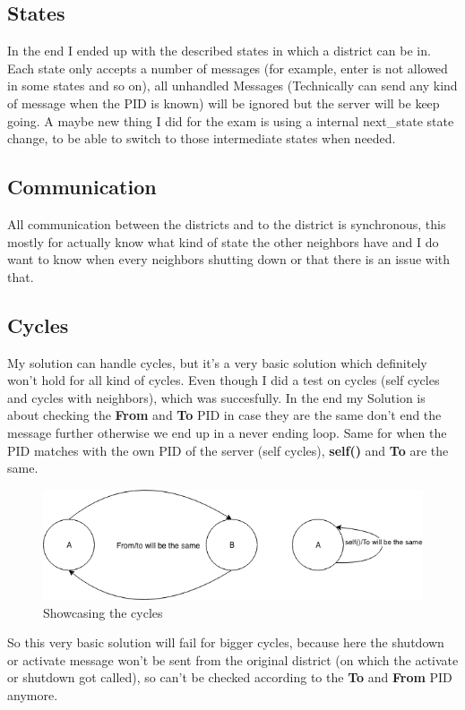 \documentclass[11pt,a4paper]{article}
\begin{document}
\subsection{States}
In the end I ended up with the described states in which a district can be in.
Each state only accepts a number of messages (for example, enter is not allowed in some states and so on),
all unhandled Messages (Technically can send any kind of message when the PID is known) will be ignored but the server will be keep going.
A maybe new thing I did for the exam is using a internal next\_state state change, to be able to switch to those intermediate states when needed.

\subsection{Communication}
All communication between the districts and to the district is synchronous, this mostly for actually know what kind of state the other neighbors have and I do want to know when every neighbors shutting down or that there is an issue with that.

\subsection{Cycles}
My solution can handle cycles, but it's a very basic solution which definitely won't hold for all kind of cycles.
Even though I did a test on cycles (self cycles and cycles with neighbors), which was succesfully.
In the end my Solution is about checking the \textbf{From} and \textbf{To} PID in case they are the same don't end the message further otherwise we end up in a never ending loop.
Same for when the PID matches with the own PID of the server (self cycles), \textbf{self()} and \textbf{To} are the same.
\begin{figure}[!htb]
\center
\includegraphics[width=\textwidth]{images/cycles}
	\caption{Showcasing the cycles}
\end{figure}

So this very basic solution will fail for bigger cycles, because here the shutdown or activate message won't be sent from the original district (on which the activate or shutdown got called), so can't be checked according to the \textbf{To} and \textbf{From} PID anymore.
\end{document}
